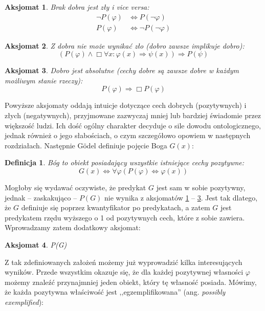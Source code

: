 \documentclass{eiti-raport}
\newtheorem{axiom}{Aksjomat}
\newtheorem{definition}{Definicja}
\begin{document}
\begin{axiom} \label{axiom:godel1}
	Brak dobra jest zły i vice versa: 
	\begin{align*}
		\neg P(\varphi) & \Leftrightarrow P(\neg \varphi) \\ 
		P(\varphi) & \Leftrightarrow \neg P( \neg \varphi )
	\end{align*}
\end{axiom}
\begin{axiom} \label{axiom:godel2}
	Z dobra nie może wynikać zło (dobro zawsze implikuje dobro): 
	\begin{equation*}
		\left( P(\varphi) \wedge \Box \forall x: \varphi(x) \Rightarrow \psi(x) \right) \Rightarrow P(\psi)
	\end{equation*}
\end{axiom}
\begin{axiom} \label{axiom:godel3}
	Dobro jest absolutne (cechy dobre są zawsze dobre w każdym możliwym stanie rzeczy):
	\begin{equation*}
		P(\varphi) \Rightarrow \Box P(\varphi)
	\end{equation*}
\end{axiom}
Powyższe aksjomaty oddają intuicje dotyczące cech dobrych (pozytywnych) i złych (negatywnych), przyjmowane zazwyczaj mniej lub bardziej świadomie przez większość ludzi. Ich dość ogólny charakter decyduje o sile dowodu ontologicznego, jednak również o jego słabościach, o czym szczegółowo opowiem w następnych rozdziałach. 
Następnie Gödel definiuje pojęcie Boga $G(x)$:
\begin{definition} \label{def:godel1}
	Bóg to obiekt posiadający wszystkie istniejące cechy pozytywne: 
	\begin{equation*}
		G(x) \Leftrightarrow \forall \varphi \left( P(\varphi) \Leftrightarrow \varphi(x) \right)
	\end{equation*}
\end{definition}
Mogłoby się wydawać oczywiste, że predykat $G$ jest sam w sobie pozytywny, jednak -- zaskakująco -- $P(G)$ nie wynika z aksjomatów \ref{axiom:godel1} -- \ref{axiom:godel3}. Jest tak dlatego, że $G$ definiuje się poprzez kwantyfikator po predykatach, a zatem $G$ jest predykatem rzędu wyższego o 1 od pozytywnych cech, które z sobie zawiera. Wprowadzamy zatem dodatkowy aksjomat:
\begin{axiom} \label{axiom:godel4}
	P(G)
\end{axiom}
Z tak zdefiniowanych założeń możemy już wyprowadzić kilka interesujących wyników. Przede wszystkim okazuje się, że dla każdej pozytywnej własności $\varphi$ możemy znaleźć przynajmniej jeden obiekt, który tę własność posiada. Mówimy, że każda pozytywna właściwość jest ,,egzemplifikowana'' (ang. \emph{possibly exemplified}):
\end{document}
